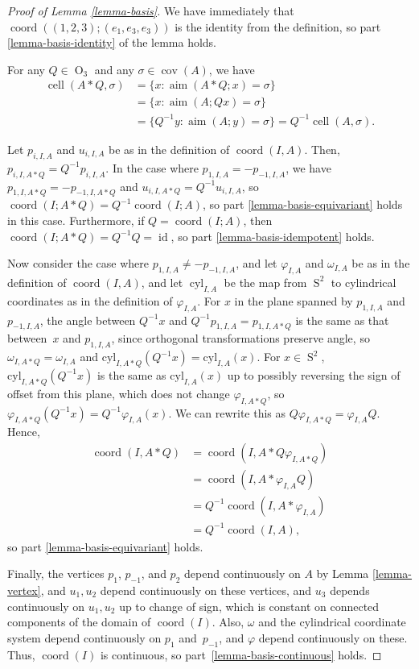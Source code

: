 \documentclass[11pt]{article}
\numberwithin{equation}{section}
\theoremstyle{remark}
\let\phi\varphi
\DeclareMathOperator{\orth}{O}
\DeclareMathOperator{\sphere}{S}
\DeclareMathOperator{\cell}{cell}
\DeclareMathOperator{\aim}{aim}
\DeclareMathOperator{\coord}{coord}
\DeclareMathOperator{\id}{id}
\DeclareMathOperator{\cov}{cov}
\DeclareMathOperator{\cyl}{cyl}
\begin{document}
\begin{proof}[Proof of Lemma \ref{lemma-basis}]
We have immediately that $\coord((1,2,3);(e_1,e_3,e_3))$ is the identity from the definition, so part \eqref{lemma-basis-identity} of the lemma holds.

For any $Q \in \orth_3$ and any $\sigma \in \cov(A)$, we have
\begin{align*}
\cell(A*Q, \sigma) &= \{x : \aim(A*Q;x) = \sigma\} \\
&= \{x : \aim(A;Qx) = \sigma\} \\
&= \{Q^{-1}y : \aim(A;y) = \sigma\}
= Q^{-1}\cell(A,\sigma).
\end{align*}

Let $p_{i,I,A}$ and $u_{i,I,A}$ be as in the definition of $\coord(I,A)$.
Then, $p_{i,I,A*Q} = Q^{-1}p_{i,I,A}$.
In the case where $p_{1,I,A} = -p_{-1,I,A}$, we have $p_{1,I,A*Q} = -p_{-1,I,A*Q}$ and $u_{i,I,A*Q} = Q^{-1} u_{i,I,A}$, so $\coord(I;A*Q) = Q^{-1}\coord(I;A)$, so part \eqref{lemma-basis-equivariant} holds in this case.
Furthermore, if $Q = \coord(I;A)$, then $\coord(I;A*Q) =Q^{-1}Q=\id$, so part \eqref{lemma-basis-idempotent} holds.

Now consider the case where $p_{1,I,A} \neq -p_{-1,I,A}$, and let $\phi_{I,A}$ and $\omega_{I,A}$
be as in the definition of $\coord(I,A)$,
and let $\cyl_{I,A}$ be the map from $\sphere^2$ to cylindrical coordinates as in the definition of $\phi_{I,A}$.
For $x$ in the plane spanned by $p_{1,I,A}$ and $p_{-1,I,A}$,
the angle between $Q^{-1}x$ and $Q^{-1}p_{1,I,A}= p_{1,I,A*Q}$ is the same as that between~$x$ and $p_{1,I,A}$, since orthogonal transformations preserve angle,
so $\omega_{I,A*Q} = \omega_{I,A}$ and $\mathrm{cyl}_{I,A*Q}(Q^{-1}x) = \mathrm{cyl}_{I,A}(x)$.
For $x \in \sphere^2$, $\mathrm{cyl}_{I,A*Q}(Q^{-1}x)$ is the same as $\mathrm{cyl}_{I,A}(x)$ up to possibly reversing the sign of offset from this plane, which does not change $\phi_{I,A*Q}$, so $\phi_{I,A*Q}(Q^{-1}x) = Q^{-1}\phi_{I,A}(x)$. We can rewrite this as $Q\phi_{I,A*Q} = \phi_{I,A}Q$.
Hence,
\begin{align*}
\coord(I,A*Q) &= \coord(I,A*Q \phi_{I,A*Q}) \\
& = \coord(I,A*\phi_{I,A}Q) \\
& = Q^{-1} \coord(I,A*\phi_{I,A}) \\
& = Q^{-1} \coord(I,A),
\end{align*}
so part \eqref{lemma-basis-equivariant} holds.

Finally, the vertices $p_{1}$, $p_{-1}$, and $p_{2}$ depend continuously on $A$ by Lemma \ref{lemma-vertex}, and $u_1,u_2$ depend continuously on these vertices, and $u_3$ depends continuously on $u_1,u_2$ up to change of sign, which is constant on connected components of the domain of $\coord(I)$.
Also, $\omega$ and the cylindrical coordinate system depend continuously on $p_{1}$ and~$p_{-1}$, and $\phi$ depend continuously on these.
Thus, $\coord(I)$ is continuous, so part~\eqref{lemma-basis-continuous} holds.
\end{proof}
\end{document}
